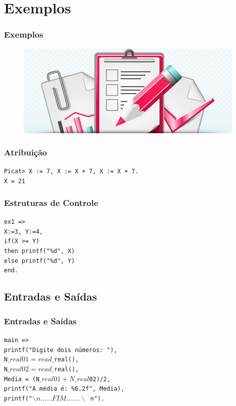 \documentclass[10pt]{beamer}
\begin{document}

\section{Exemplos}
\begin{frame}
    \frametitle{Exemplos}
    \begin{figure}[!ht]
    \centering
    \includegraphics[width=.6\textwidth]{figures/exercicio.jpg}
    \end{figure}
\end{frame}


\begin{frame}
    \frametitle{Atribuição}
     \texttt{Picat> X := 7, X := X + 7, X := X + 7.}\\
     \texttt{X = 21}
\end{frame}


\begin{frame}
    \frametitle{Estruturas de Controle}
     \texttt{ex1 =>}\\
     \texttt{X:=3, Y:=4,}\\
     \texttt{if(X >= Y)}\\
     \texttt{then printf("\%d", X)}\\
     \texttt{else printf("\%d", Y)}\\
     \texttt{end.}
\end{frame}


\subsection{Entradas e Sa\'idas}
\begin{frame}
    \frametitle{Entradas e Saídas}
    \texttt{main =>}\\
    \texttt{printf("Digite dois números: "),}\\
    \texttt{N$\_real01 = read\_$real(),}\\
    \texttt{N$\_real02 = read\_$real(),}\\
    \texttt{Media = (N$\_real01+N\_real$02)/2,}\\
    \texttt{printf("A média é: \%6.2f", Media),}\\
    \texttt{printf("$\backslash n ......FIM....... \backslash$ n").}
\end{frame}
\end{document}

